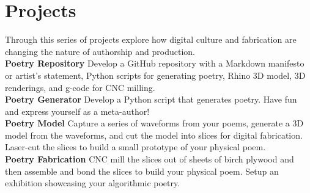 \documentclass[11pt,article,oneside]{memoir}
\begin{document}
\clearpage

%


\section{Projects}
Through this series of projects
explore how digital culture and fabrication
are changing the nature of authorship
and production. 
\\

\noindent \textbf{Poetry Repository}
Develop a GitHub repository with 
a Markdown manifesto or artist's statement,
Python scripts for generating poetry,
Rhino 3D model, 3D renderings,
and g-code for CNC milling. \\

\noindent \textbf{Poetry Generator}
Develop a Python script that generates poetry.
Have fun and express yourself as a meta-author! \\

\noindent \textbf{Poetry Model}
Capture a series of waveforms from your poems,
generate a 3D model from the waveforms,
and cut the model into slices for digital fabrication. 
Laser-cut the slices to build a small prototype 
of your physical poem. \\

\noindent \textbf{Poetry Fabrication}
CNC mill the slices out of sheets of birch plywood 
and then assemble and bond the slices
to build your physical poem. 
Setup an exhibition showcasing your algorithmic poetry. \\
\end{document}
